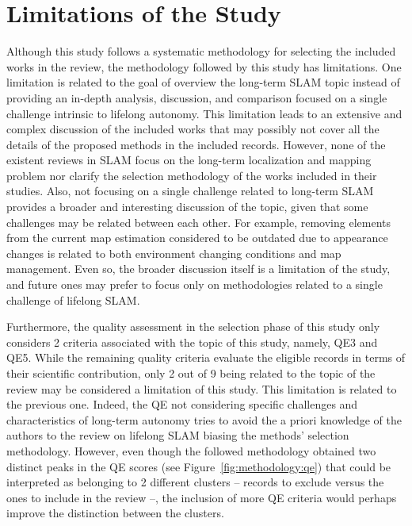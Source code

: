 \section{Limitations of the Study}
\label{sec:limitations}

Although this study follows a systematic methodology for selecting the included works in the review, the methodology followed by this study has limitations. One limitation is related to the goal of overview the long-term SLAM topic instead of providing an in-depth analysis, discussion, and comparison focused on a single challenge intrinsic to lifelong autonomy. This limitation leads to an extensive and complex discussion of the included works that may possibly not cover all the details of the proposed methods in the included records.
However, none of the existent reviews in SLAM focus on the long-term localization and mapping problem nor clarify the selection methodology of the works included in their studies. Also, not focusing on a single challenge related to long-term SLAM provides a broader and interesting discussion of the topic, given that some challenges may be related between each other. For example, removing elements from the current map estimation considered to be outdated due to appearance changes is related to both environment changing conditions and map management.
Even so, the broader discussion itself is a limitation of the study, and future ones may prefer to focus only on methodologies related to a single challenge of lifelong SLAM.

Furthermore, the quality assessment in the selection phase of this study only considers 2 criteria associated with the topic of this study, namely, QE3 and QE5. While the remaining quality criteria evaluate the eligible records in terms of their scientific contribution, only 2 out of 9 being related to the topic of the review may be considered a limitation of this study. This limitation is related to the previous one. Indeed, the QE not considering specific challenges and characteristics of long-term autonomy tries to avoid the a priori knowledge of the authors to the review on lifelong SLAM biasing the methods' selection methodology.
However, even though the followed methodology obtained two distinct peaks in the QE scores (see Figure~\ref{fig:methodology:qe}) that could be interpreted as belonging to 2 different clusters -- records to exclude versus the ones to include in the review --, the inclusion of more QE criteria would perhaps improve the distinction between the clusters.

